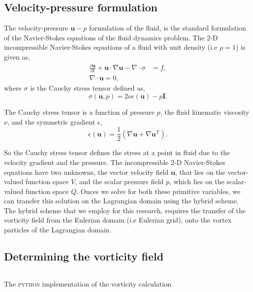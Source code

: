 \subsection{Velocity-pressure formulation}
The velocity-pressure $\mathbf{u}-p$ formulation of the fluid, is the standard formulation of the Navier-Stokes equations of the fluid dynamics problem. The 2-D incompressible Navier-Stokes equations of a fluid with unit density (i.e $\rho = 1$) is given as,
	\begin{subequations}
	\begin{align}
	\frac{\partial \mathbf{u}}{\partial t} + \mathbf{u}\cdot\nabla\mathbf{u} - \nabla \cdot \sigma &= f,\\
	\nabla \cdot \mathbf{u} = 0,
	\end{align}	
	\label{eq:2Dns}
	\end{subequations}
where $\sigma$ is the Cauchy stress tensor defined as,
	\begin{equation}
	\sigma(\mathbf{u},p) = 2\nu\epsilon(\mathbf{u}) - p\mathbf{I}.
	\end{equation}

The Cauchy stress tensor is a function of pressure $p$, the fluid kinematic viscosity $\nu$, and the symmetric gradient $\epsilon$,
	\begin{equation}
	\epsilon(\mathbf{u}) = \frac{1}{2} \left(\nabla \mathbf{u} + \nabla \mathbf{u}^{\mathrm{T}}\right).
	\label{eq:symGrad}
	\end{equation}

So the Cauchy stress tensor defines the stress at a point in fluid due to the velocity gradient and the pressure. The incompressible 2-D Navier-Stokes equations have two unknowns, the vector velocity field $\mathbf{u}$, that lies on the vector-valued function space $V$, and the scalar pressure field $p$, which lies on the scalar-valued function space $Q$. Onces we solve for both these primitive variables, we can transfer this solution on the Lagrangian domain using the hybrid scheme. The hybrid scheme that we employ for this research, requires the transfer of the vorticity field from the Eulerian domain (i.e Eulerian grid), onto the vortex particles of the Lagrangian domain.


\subsection{Determining the vorticity field}

	\begin{listing}[t]
	\inputminted[fontseries=courier,obeytabs,fontsize=\footnotesize,mathescape,linenos,numbersep=5pt,frame=lines,framesep=2mm,xleftmargin=20mm,xrightmargin=20mm]{python}{figures/eulerian/vorticity.py}
	\caption{The \textsc{python} implementation of the vorticity calculation}
	\label{lst:pycode-vorticity}
	\end{listing}

